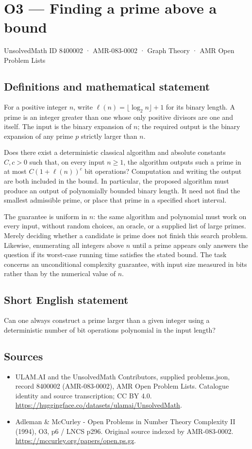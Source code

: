 \documentclass[11pt,a4paper]{article}
\begin{document}
\section*{O3 — Finding a prime above a bound}\label{8400002}
{\small UnsolvedMath ID 8400002 · AMR-083-0002 · Graph Theory · AMR Open Problem Lists}
\subsection{Definitions and mathematical statement}
For a positive integer $n$, write $\ell(n)=\lfloor\log_2 n\rfloor+1$ for its binary length. A prime is an integer greater than one whose only positive divisors are one and itself. The input is the binary expansion of $n$; the required output is the binary expansion of any prime $p$ strictly larger than $n$.

Does there exist a deterministic classical algorithm and absolute constants $C,c>0$ such that, on every input $n\ge1$, the algorithm outputs such a prime in at most $C(1+\ell(n))^c$ bit operations? Computation and writing the output are both included in the bound. In particular, the proposed algorithm must produce an output of polynomially bounded binary length. It need not find the smallest admissible prime, or place that prime in a specified short interval.

The guarantee is uniform in $n$: the same algorithm and polynomial must work on every input, without random choices, an oracle, or a supplied list of large primes. Merely deciding whether a candidate is prime does not finish this search problem. Likewise, enumerating all integers above $n$ until a prime appears only answers the question if its worst-case running time satisfies the stated bound. The task concerns an unconditional complexity guarantee, with input size measured in bits rather than by the numerical value of $n$.
\subsection{Short English statement}
Can one always construct a prime larger than a given integer using a deterministic number of bit operations polynomial in the input length?
\subsection{Sources}
\begin{itemize}
\item[S1] ULAM.AI and the UnsolvedMath Contributors, supplied problems.json, record 8400002 (AMR-083-0002), AMR Open Problem Lists. Catalogue identity and source transcription; CC BY 4.0.
\url{https://huggingface.co/datasets/ulamai/UnsolvedMath}.
\item[S2] Adleman \& McCurley - Open Problems in Number Theory Complexity II (1994), O3, p6 / LNCS p296. Original source indexed by AMR-083-0002.
\url{https://mccurley.org/papers/open.ps.gz}.
\end{itemize}
\end{document}
